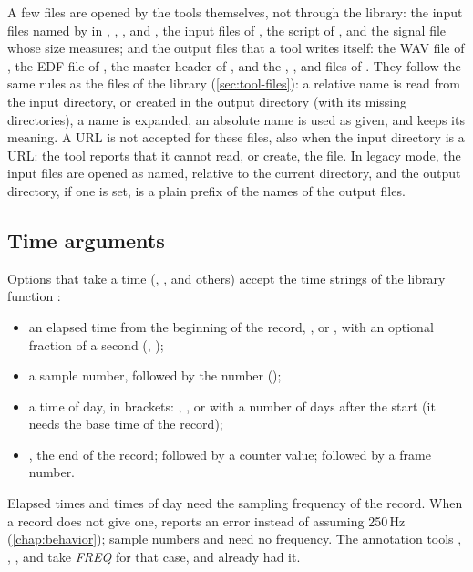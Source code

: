 A few files are opened by the tools themselves, not through the library: the input files
named by  in , , ,  and ,
the input files of , the script of , and the signal file
whose size  measures; and the output files that a tool writes itself: the WAV
file of , the EDF file of , the master header of ,
and the , ,  and  files of .
They follow the same rules as the files of the library (\cref{sec:tool-files}): a relative
name is read from the input directory, or created in the output directory (with its
missing directories), a \code{\textasciitilde} name is expanded, an absolute name is used
as given, and \code{-} keeps its meaning. A URL is not accepted for these files, also when
the input directory is a URL: the tool reports that it cannot read, or create, the file. In legacy mode, the input files are
opened as named, relative to the current directory, and the output directory, if one is
set, is a plain prefix of the names of the output files.

\subsection{Time arguments}
\label{sec:tools-times}

Options that take a time (, ,  and others) accept the time strings
of the library function :
\begin{itemize}
\item an elapsed time from the beginning of the record, ,  or
  , with an optional fraction of a second (, );
\item a sample number,  followed by the number ();
\item a time of day, in brackets: \code{[hh:mm:ss]}, \code{[hh:mm:ss dd/mm/yyyy]}, or
  \code{[hh:mm:ss d]} with a number of days after the start (it needs the base time of the
  record);
\item {}, the end of the record;  followed by a counter value; 
  followed by a frame number.
\end{itemize}
Elapsed times and times of day need the sampling frequency of the record. When a record
does not give one, \wfdbx{} reports an error instead of assuming 250\,Hz
(\cref{chap:behavior}); sample numbers and  need no frequency. The annotation tools
, , ,  and  take 
\textit{FREQ} for that case, and  already had it.

